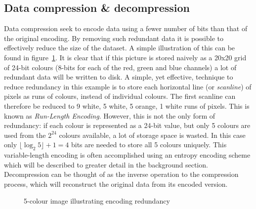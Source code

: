\subsection{Data compression \& decompression}
Data compression seek to encode data using a fewer number of bits than that of the original encoding. By removing such redundant data it is possible to effectively 
reduce the size of the dataset. A simple illustration of this can be found in figure~\ref{COMP_ILLUS}. It is clear that if this picture is stored naively as a 20x20
grid of 24-bit colours (8-bits for each of the red, green and blue channels) a lot of redundant data will be written to disk. A simple, yet effective, technique to 
reduce redundancy in this example is to store each horizontal line (or \textit{scanline}) of pixels as runs of colours, instead of individual colours. The first 
scanline can therefore be reduced to 9 white, 5 white, 5 orange, 1 white runs of pixels. This is known as \textit{Run-Length Encoding}. However, this is not the only 
form of redundancy: if each colour is represented as a 24-bit value, but only 5 colours are used from the $2^{24}$ colours available, a lot of storage space is wasted. 
In this case only  $\lfloor\log_{2}{5}\rfloor+1 = 4$ bits are needed to store all 5 colours uniquely. This variable-length encoding is often accomplished using an 
entropy encoding scheme which will be described to greater detail in the background section. Decompression can be thought of as the inverse operation to the compression 
process, which will reconstruct the original data from its encoded version.
\begin{figure}[ht!]
  \centering
 \caption{5-colour image illustrating encoding redundancy}
 \label{COMP_ILLUS}
\end{figure}
